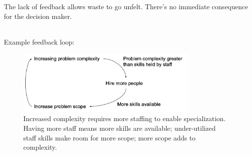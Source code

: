 The lack of feedback allows waste to go unfelt. There's no immediate consequence for the decision maker.

\ \\

Example feedback loop:
\begin{center}
\begin{figure}[ht]
    \centering
    \includegraphics[width=0.8\textwidth]{images/feedback_loop_complexity_and_staffing}
    \caption{Increased complexity requires more staffing to enable specialization. Having more staff means more skills are available; under-utilized staff skills make room for more scope; more scope adds to complexity.}
    \label{fig:complexity_and_staff_growth}
\end{figure}
\end{center}

